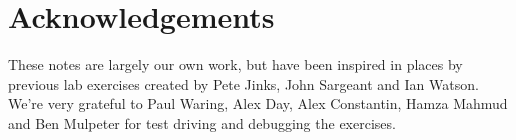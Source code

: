 \section{Acknowledgements}
These notes are largely our own work, but have been inspired in places by previous lab exercises created by Pete Jinks, John Sargeant and Ian Watson. We're very grateful to Paul Waring, Alex Day, Alex Constantin, Hamza Mahmud and Ben Mulpeter for test driving and debugging the exercises.
